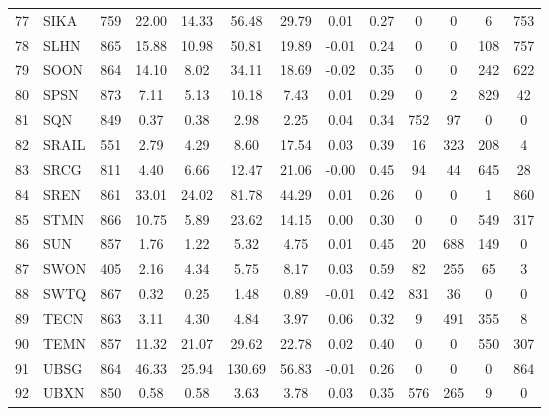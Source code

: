 \documentclass[11pt,a4paper]{article}
\begin{document}
\begin{doublespacing}
\begin{small}
\begin{longtable}{llc|cc|cc|cc|cccc}
                77  & SIKA  & 759 & 22.00  & 14.33    & 56.48  & 29.79    & 0.01  & 0.27     & 0     & 0     & 6     & 753   \\
                78  & SLHN  & 865 & 15.88  & 10.98    & 50.81  & 19.89    & -0.01 & 0.24     & 0     & 0     & 108   & 757   \\
                79  & SOON  & 864 & 14.10  & 8.02     & 34.11  & 18.69    & -0.02 & 0.35     & 0     & 0     & 242   & 622   \\
                80  & SPSN  & 873 & 7.11   & 5.13     & 10.18  & 7.43     & 0.01  & 0.29     & 0     & 2     & 829   & 42    \\
                81  & SQN   & 849 & 0.37   & 0.38     & 2.98   & 2.25     & 0.04  & 0.34     & 752   & 97    & 0     & 0     \\
                82  & SRAIL & 551 & 2.79   & 4.29     & 8.60   & 17.54    & 0.03  & 0.39     & 16    & 323   & 208   & 4     \\
                83  & SRCG  & 811 & 4.40   & 6.66     & 12.47  & 21.06    & -0.00 & 0.45     & 94    & 44    & 645   & 28    \\
                84  & SREN  & 861 & 33.01  & 24.02    & 81.78  & 44.29    & 0.01  & 0.26     & 0     & 0     & 1     & 860   \\
                85  & STMN  & 866 & 10.75  & 5.89     & 23.62  & 14.15    & 0.00  & 0.30     & 0     & 0     & 549   & 317   \\
                86  & SUN   & 857 & 1.76   & 1.22     & 5.32   & 4.75     & 0.01  & 0.45     & 20    & 688   & 149   & 0     \\
                87  & SWON  & 405 & 2.16   & 4.34     & 5.75   & 8.17     & 0.03  & 0.59     & 82    & 255   & 65    & 3     \\
                88  & SWTQ  & 867 & 0.32   & 0.25     & 1.48   & 0.89     & -0.01 & 0.42     & 831   & 36    & 0     & 0     \\
                89  & TECN  & 863 & 3.11   & 4.30     & 4.84   & 3.97     & 0.06  & 0.32     & 9     & 491   & 355   & 8     \\
                90  & TEMN  & 857 & 11.32  & 21.07    & 29.62  & 22.78    & 0.02  & 0.40     & 0     & 0     & 550   & 307   \\
                91  & UBSG  & 864 & 46.33  & 25.94    & 130.69 & 56.83    & -0.01 & 0.26     & 0     & 0     & 0     & 864   \\
                92  & UBXN  & 850 & 0.58   & 0.58     & 3.63   & 3.78     & 0.03  & 0.35     & 576   & 265   & 9     & 0     \\

\end{longtable}
\end{small}
\end{doublespacing}
\end{document}
